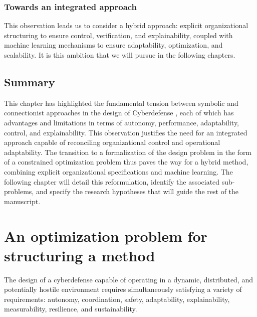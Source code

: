 \subsection* {Towards an integrated approach}

This observation leads us to consider a hybrid approach: explicit organizational structuring to ensure control, verification, and explainability, coupled with machine learning mechanisms to ensure adaptability, optimization, and scalability. It is this ambition that we will pursue in the following chapters.

\section{Summary}
This chapter has highlighted the fundamental tension between symbolic and connectionist approaches in the design of Cyberdefense , each of which has advantages and limitations in terms of autonomy, performance, adaptability, control, and explainability. This observation justifies the need for an integrated approach capable of reconciling organizational control and operational adaptability. The transition to a formalization of the design problem in the form of a constrained optimization problem thus paves the way for a hybrid method, combining explicit organizational specifications and machine learning. The following chapter will detail this reformulation, identify the associated sub-problems, and specify the research hypotheses that will guide the rest of the manuscript.

\clearpage
\thispagestyle{empty}
\null
\newpage

\chapter{An optimization problem for structuring a method}
\label{chap:hypotheses}

The design of a cyberdefense  capable of operating in a dynamic, distributed, and potentially hostile environment requires simultaneously satisfying a variety of requirements: autonomy, coordination, safety, adaptability, explainability, measurability, resilience, and sustainability.

